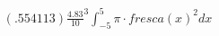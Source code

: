 \documentclass[preview]{standalone}
\begin{document}
\begin{align*}
\left(.554113\right)\frac{4.83}{10}^{3}\int_{-5}^{5}\pi\cdot fresca(x)^{2}dx
\end{align*}
\end{document}
